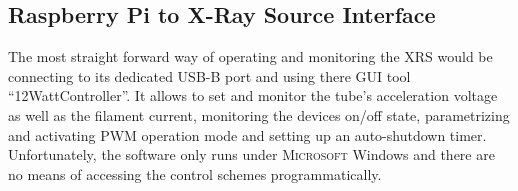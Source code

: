         \subsection{Raspberry Pi to X-Ray Source Interface}
            The most straight forward way of operating and monitoring the XRS would be connecting to its dedicated USB-B port and using there GUI tool ``12WattController''.
            It allows to set and monitor the tube's acceleration voltage as well as the filament current, monitoring the devices on/off state, parametrizing and activating PWM operation mode and setting up an auto-shutdown timer.
            Unfortunately, the software only runs under \textsc{Microsoft} Windows and there are no means of accessing the control schemes programmatically.\par\medskip

